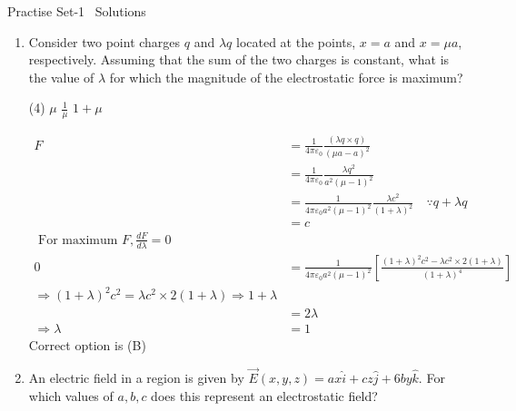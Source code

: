 \newpage
\begin{abox}
	Practise Set-1 \ Solutions
\end{abox}
\begin{enumerate}[label=\color{ocre}\textbf{\arabic*.}]
	\item Consider two point charges $q$ and $\lambda q$ located at the points, $x=a$ and $x=\mu a$,
	respectively. Assuming that the sum of the two charges is constant, what is the value of
	$\lambda$ for which the magnitude of the electrostatic force is maximum?
	{}
	\begin{tasks}(4)
		\task[\textbf{A.}]  $\mu$
		\task[\textbf{C.}]$\frac{1}{\mu}$
		\task[\textbf{D.}] $1+\mu$
	\end{tasks}
	\begin{answer}
		\begin{align*}
		F&=\frac{1}{4 \pi \varepsilon_{0}} \frac{(\lambda q \times q)}{(\mu a-a)^{2}}\\&=\frac{1}{4 \pi \varepsilon_{0}} \frac{\lambda q^{2}}{a^{2}(\mu-1)^{2}}\\&=\frac{1}{4 \pi \varepsilon_{0} a^{2}(\mu-1)^{2}} \frac{\lambda c^{2}}{(1+\lambda)^{2}} \quad \because q+\lambda q\\&=c \\
		\text { For maximum } F, \frac{d F}{d \lambda}=0 \\0&= \frac{1}{4 \pi \varepsilon_{0} a^{2}(\mu-1)^{2}}\left[\frac{(1+\lambda)^{2} c^{2}-\lambda c^{2} \times 2(1+\lambda)}{(1+\lambda)^{4}}\right] \\
		\Rightarrow(1+\lambda)^{2} c^{2}=\lambda c^{2} \times 2(1+\lambda) \Rightarrow 1+\lambda\\&=2 \lambda \\\Rightarrow \lambda&=1
		\end{align*}
		Correct option is (B)
	\end{answer}
\item  An electric field in a region is given by $\vec{E}(x, y, z)=a x \hat{i}+c z \hat{j}+6 b y \hat{k} .$ For which values of
$a, b, c$ does this represent an electrostatic field?
{}


\end{enumerate}
